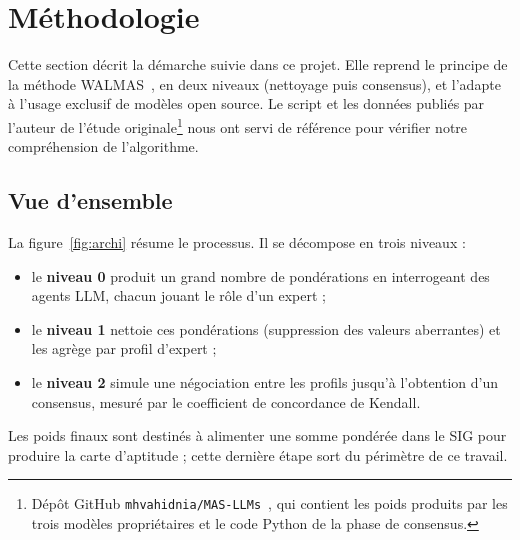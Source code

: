 \documentclass[11pt,a4paper]{article}
\newcommand{\code}[1]{\texttt{#1}}
\begin{document}
\section{Méthodologie}\label{sec:methodo}

Cette section décrit la démarche suivie dans ce projet. Elle reprend le principe de la méthode WALMAS~\cite{vahidnia}, en deux niveaux (nettoyage puis consensus), et l'adapte à l'usage exclusif de modèles open source. Le script et les données publiés par l'auteur de l'étude originale\footnote{Dépôt GitHub \code{mhvahidnia/MAS-LLMs}~\cite{masllms}, qui contient les poids produits par les trois modèles propriétaires et le code Python de la phase de consensus.} nous ont servi de référence pour vérifier notre compréhension de l'algorithme.

\subsection{Vue d'ensemble}

La figure~\ref{fig:archi} résume le processus. Il se décompose en trois niveaux :
\begin{itemize}
  \item le \textbf{niveau 0} produit un grand nombre de pondérations en interrogeant des agents LLM, chacun jouant le rôle d'un expert ;
  \item le \textbf{niveau 1} nettoie ces pondérations (suppression des valeurs aberrantes) et les agrège par profil d'expert ;
  \item le \textbf{niveau 2} simule une négociation entre les profils jusqu'à l'obtention d'un consensus, mesuré par le coefficient de concordance de Kendall.
\end{itemize}
Les poids finaux sont destinés à alimenter une somme pondérée dans le SIG pour produire la carte d'aptitude ; cette dernière étape sort du périmètre de ce travail.
\end{document}
